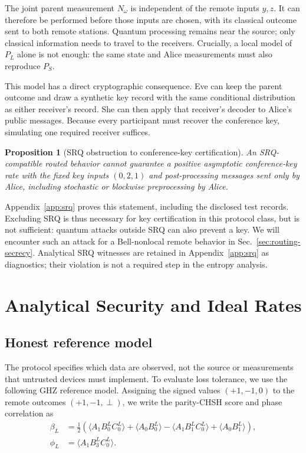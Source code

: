 \documentclass[aps,10pt,onecolumn,prx,superscriptaddress,longbibliography,nofootinbib]{revtex4-2}
\newcommand{\perpout}{\perp}
\newtheorem{proposition}[theorem]{Proposition}
\begin{document}
The joint parent measurement \(N_\omega\) is independent of the remote inputs \(y,z\). It can therefore be performed before those inputs are chosen, with its classical outcome sent to both remote stations. Quantum processing remains near the source; only classical information needs to travel to the receivers. Crucially, a local model of \(P_L\) alone is not enough: the same state and Alice measurements must also reproduce \(P_S\).

This model has a direct cryptographic consequence. Eve can keep the parent outcome and draw a synthetic key record with the same conditional distribution as either receiver's record. She can then apply that receiver's decoder to Alice's public messages. Because every participant must recover the conference key, simulating one required receiver suffices.

\begin{proposition}[SRQ obstruction to conference-key certification]\label{prop:srq-obstruction}
An SRQ-compatible routed behavior cannot guarantee a positive asymptotic conference-key rate with the fixed key inputs \((0,2,1)\) and post-processing messages sent only by Alice, including stochastic or blockwise preprocessing by Alice.
\end{proposition}

Appendix~\ref{app:srq} proves this statement, including the disclosed test records. Excluding SRQ is thus necessary for key certification in this protocol class, but is not sufficient: quantum attacks outside SRQ can also prevent a key. We will encounter such an attack for a Bell-nonlocal remote behavior in Sec.~\ref{sec:routing-secrecy}. Analytical SRQ witnesses are retained in Appendix~\ref{app:srq} as diagnostics; their violation is not a required step in the entropy analysis.

\section{Analytical Security and Ideal Rates}\label{sec:protocols}

\subsection{Honest reference model}

The protocol specifies which data are observed, not the source or measurements that untrusted devices must implement. To evaluate loss tolerance, we use the following GHZ reference model. Assigning the signed values $(+1,-1,0)$ to the remote outcomes $(+1,-1,\perpout)$, we write the parity-CHSH score and phase correlation as
\begin{align}
 \beta_L
 &=\frac12\left(
 \langle A_1B_0^{L}C_0^{L}\rangle
 +\langle A_0B_0^{L}\rangle
 -\langle A_1B_1^{L}C_0^{L}\rangle
 +\langle A_0B_1^{L}\rangle
 \right),\label{eq:remote-parity-score}\\
 \phi_L&=\langle A_1B_3^{L}C_0^{L}\rangle.
 \label{eq:remote-phase}
\end{align}
\end{document}
